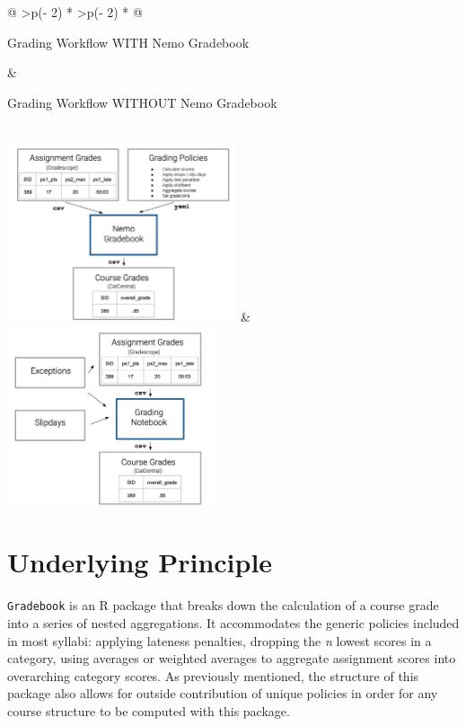 \documentclass[10pt,a4paper,onecolumn]{article}
\begin{document}
\begin{longtable}[]{@{}
  >{\centering\arraybackslash}p{(\columnwidth - 2\tabcolsep) * }
  >{\centering\arraybackslash}p{(\columnwidth - 2\tabcolsep) * }@{}}
\toprule\noalign{}
\begin{minipage}[b]{\linewidth}\centering
Grading Workflow WITH Nemo Gradebook
\end{minipage} & \begin{minipage}[b]{\linewidth}\centering
Grading Workflow WITHOUT Nemo Gradebook
\end{minipage} \\
\midrule\noalign{}
\endhead
\bottomrule\noalign{}
\endlastfoot
\includegraphics[width=\textwidth,height=2.08333in]{with_nemogb_workflow.png}
&
\includegraphics[width=\textwidth,height=2.08333in]{without_nemogb_workflow.png} \\
\end{longtable}

\hypertarget{underlying-principle}{%
\section{Underlying Principle}\label{underlying-principle}}

\texttt{Gradebook} is an R package that breaks down the calculation of a
course grade into a series of nested aggregations. It accommodates the
generic policies included in most syllabi: applying lateness penalties,
dropping the \emph{n} lowest scores in a category, using averages or
weighted averages to aggregate assignment scores into overarching
category scores. As previously mentioned, the structure of this package
also allows for outside contribution of unique policies in order for any
course structure to be computed with this package.
\end{document}
